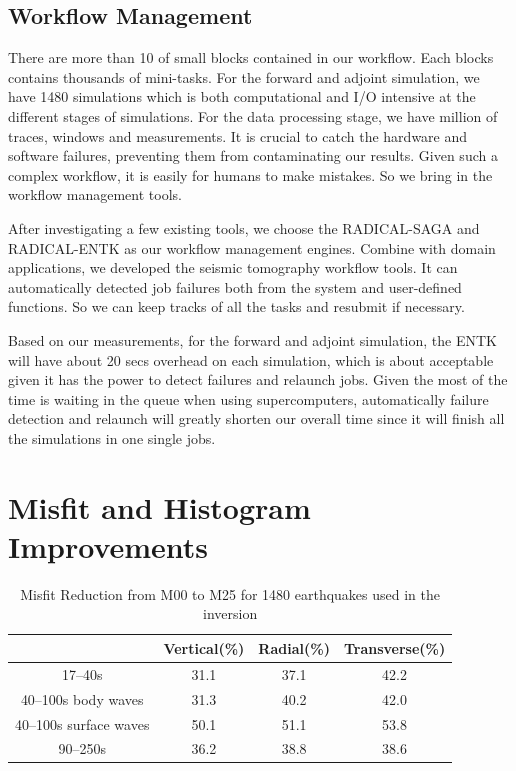 \documentclass[extra,mreferee]{gji}
\begin{document}
\subsection{Workflow Management}

There are more than 10 of small blocks contained in our workflow. Each blocks contains thousands of mini-tasks. For the forward and adjoint simulation, we have 1480 simulations which is both computational and I/O intensive at the different stages of simulations. For the data processing stage, we have million of traces, windows and measurements. It is crucial to catch the hardware and software failures, preventing them from contaminating our results. Given such a complex workflow, it is easily for humans to make mistakes. So we bring in the workflow management tools.

After investigating a few existing tools, we choose the RADICAL-SAGA and RADICAL-ENTK as our workflow management engines. Combine with domain applications, we developed the seismic tomography workflow tools. It can automatically detected job failures both from the system and user-defined functions. So we can keep tracks of all the tasks and resubmit if necessary.

Based on our measurements, for the forward and adjoint simulation, the ENTK will have about 20 secs overhead on each simulation, which is about acceptable given it has the power to detect failures and relaunch jobs. Given the most of the time is waiting in the queue when using supercomputers, automatically failure detection and relaunch will greatly shorten our overall time since it will finish all the simulations in one single jobs.


\section{Misfit and Histogram Improvements}

\begin{table}[!htb]
  \centering
  \begin{tabular}{|c|c|c|c|}
    \hline
     ~          &  Vertical(\%) & Radial(\%) &  Transverse(\%) \\
    \hline
    17--40s                &    31.1    &       37.1 &       42.2 \\
    40--100s body waves    &    31.3    &       40.2 &       42.0 \\
    40--100s surface waves &    50.1    &       51.1 &       53.8 \\
    90--250s               &    36.2    &       38.8 &       38.6 \\
    \hline
  \end{tabular}\\
  \caption{Misfit Reduction from M00 to M25 for 1480 earthquakes used in the inversion}
  \label{table:categories}
\end{table}
\end{document}
